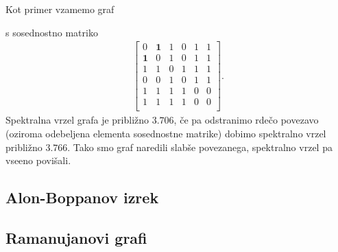 \begin{primer}
    Kot primer vzamemo graf
    \begin{figure}[h!]
        \centering
    \end{figure}
    s sosednostno matriko
    \begin{align*}
        \begin{bmatrix}
            0          & \mathbf{1} & 1 & 0 & 1 & 1 \\
            \mathbf{1} & 0          & 1 & 0 & 1 & 1 \\
            1          & 1          & 0 & 1 & 1 & 1 \\
            0          & 0          & 1 & 0 & 1 & 1 \\
            1          & 1          & 1 & 1 & 0 & 0 \\
            1          & 1          & 1 & 1 & 0 & 0 \\
        \end{bmatrix}.
    \end{align*}
    Spektralna vrzel grafa je približno \(3.706\), če pa odstranimo rdečo povezavo (oziroma odebeljena elementa sosednostne matrike) dobimo spektralno vrzel približno \(3.766\). Tako smo graf naredili slabše povezanega, spektralno vrzel pa vseeno povišali.
\end{primer}

\subsection{Alon-Boppanov izrek}
\subsection{Ramanujanovi grafi}